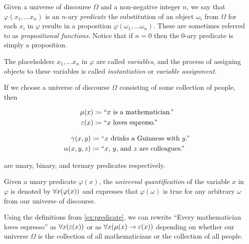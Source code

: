 \begin{definition}[Predicate]
    Given a universe of discourse $\Omega$ and a non-negative integer $n$,
    we say that $\varphi(x_1, \dots x_n)$ is an $n$-ary \emph{predicate}
    \iffbydefn the substitution of an object $\omega_i$ from $\Omega$ for each $x_i$ in $\varphi$
    results in a proposition $\varphi(\omega_1, \dots \omega_n)$.
    These are sometimes referred to as \emph{propositional functions}.
    Notice that if $n = 0$ then the $0$-ary predicate is simply a proposition.

    The placeholders $x_1, \dots x_n$ in $\varphi$ are called \emph{variables},
    and the process of assigning objects to these variables is called
    \emph{instantiation} or \emph{variable assignment}.
\end{definition}
\begin{example}\label{ex:predicate}
    If we choose a universe of discourse $\Omega$ consisting of some collection of people, then

    \begin{minipage}{.45\linewidth}
        \vspace{-\parskip-\abovedisplayskip}
        \begin{align*}
            \mu(x) &\coloneqq \text{``}x \text{ is a mathematician.''}\\
            \varepsilon(x) &\coloneqq \text{``}x \text{ loves espresso.''}
        \end{align*}
    \end{minipage}%
    \begin{minipage}{.45\linewidth}
        \vspace{-\parskip-\abovedisplayskip}
        \begin{align*}
            \gamma(x, y) &\coloneqq \text{``}x \text{ drinks a Guinness with } y\text{.''}\\
            \alpha(x, y, z) &\coloneqq \text{``}x\text{, }y\text{, and } z \text{ are colleagues.''}
        \end{align*}
    \end{minipage}

    are unary, binary, and ternary predicates respectively.
\end{example}

\begin{definition}
    Given a unary predicate $\varphi(x)$,
    the \emph{universal quantification} of the variable $x$ in $\varphi$
    is denoted by $\forall x \pn*{\varphi(x)}$
    and expresses that $\varphi(\omega)$ is true for any arbitrary $\omega$ from our universe of discourse.
\end{definition}
\begin{example}
    Using the definitions from \autoref{ex:predicate},
    we can rewrite ``Every mathematician loves espresso'' as
    $\forall x \pn*{\varepsilon(x)}$ or as $\forall x \pn*{\mu(x) \rightarrow \varepsilon(x)}$
    depending on whether our universe $\Omega$
    is the collection of all mathematicians or the collection of all people.
\end{example}

